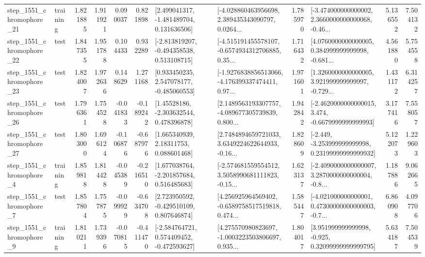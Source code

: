 \begin{tabular}{llrrrrllrlrr}
 step\_1551\_chromophore\_21 &  training &      1.821885 &    1.911921 &      0.090037 &  0.821898 &    [2.499041317, -1.481489704, 0.131636506] &  [-4.028860463956698, 2.389435343090797, 0.0264... &       1.785970 &  [-3.474000000000002, 2.3660000000000068, -0.46... &            5.136552 &          7.504132 \\
 step\_1551\_chromophore\_22 &      test &      1.847355 &    1.951788 &      0.104433 &  0.932289 &   [-2.813819207, -0.494358538, 0.513108715] &  [-4.515191455578107, -0.6574934312706885, 0.35... &       1.716432 &  [4.0760000000000005, 0.384999999999998, -0.681... &            4.561880 &          5.754558 \\
 step\_1551\_chromophore\_23 &      test &      1.824007 &    1.972636 &      0.148629 &  1.271168 &    [0.933450235, 2.547078177, -0.485060553] &  [-1.9276838856513066, -4.176399337474411, 0.97... &       1.971601 &  [1.3260000000000005, 3.921999999999997, -0.729... &            1.431172 &          6.314257 \\
 step\_1551\_chromophore\_26 &      test &      1.796361 &    1.754528 &     -0.041833 & -0.189242 &     [1.45528186, -2.303632544, 0.478396878] &  [2.1489563193307757, -4.089677305739839, 0.800... &       1.942842 &  [-2.4620000000000015, 3.474, -0.6679999999999993] &            3.177416 &          7.558057 \\
 step\_1551\_chromophore\_27 &      test &      1.803000 &    1.696124 &     -0.106876 & -0.687976 &      [1.665340939, 2.18311753, 0.088601468] &  [2.7484894659721033, 3.6349224622644933, -0.16... &       1.828609 &  [-2.449, -3.253999999999998, 0.23199999999999932] &            5.122073 &          1.229603 \\
  step\_1551\_chromophore\_4 &  training &      1.859818 &    1.814428 &     -0.045389 & -0.216510 &    [1.677038764, -2.201857684, 0.516485683] &  [-2.574681559554512, 3.5058990681111823, -0.15... &       1.623137 &  [-2.4090000000000007, 3.2870000000000004, -0.8... &            1.187886 &          9.062665 \\
  step\_1551\_chromophore\_7 &      test &      1.857804 &    1.757875 &     -0.099929 & -0.634708 &    [2.723950592, -0.429510109, 0.807646874] &  [4.256925964569402, -0.6589758517519818, 0.474... &       1.585447 &  [-4.021000000000001, 0.47300000000000003, -0.7... &            6.860908 &          4.097706 \\
  step\_1551\_chromophore\_9 &  training &      1.810211 &    1.739396 &     -0.070815 & -0.411470 &   [-2.584764721, 0.574409452, -0.472593627] &  [4.275570980823697, -1.0003223503806697, 0.935... &       1.804017 &   [3.951999999999998, -0.925, 0.32099999999999795] &            5.634187 &          7.504539 \\

\end{tabular}
